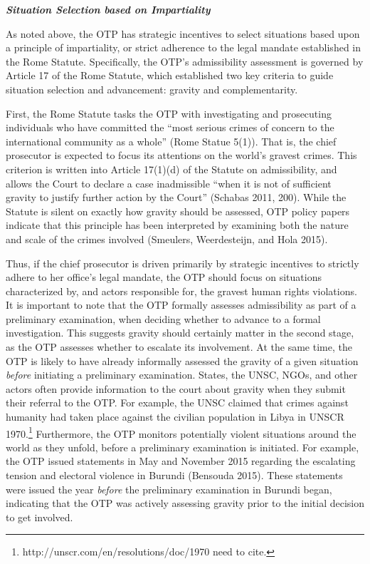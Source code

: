 \emph{\textbf{Situation Selection based on Impartiality}}

As noted above, the OTP has strategic incentives to select situations based upon a principle of impartiality, or strict adherence to the legal mandate established in the Rome Statute. Specifically, the OTP's admissibility assessment is governed by Article 17 of the Rome Statute, which established two key criteria to guide situation selection and advancement: gravity and complementarity.

First, the Rome Statute tasks the OTP with investigating and prosecuting individuals who have committed the ``most serious crimes of concern to the international community as a whole'' (Rome Statue 5(1)). That is, the chief prosecutor is expected to focus its attentions on the world's gravest crimes. This criterion is written into Article 17(1)(d) of the Statute on admissibility, and allows the Court to declare a case inadmissible ``when it is not of sufficient gravity to justify further action by the Court'' (Schabas 2011, 200). While the Statute is silent on exactly how gravity should be assessed, OTP policy papers indicate that this principle has been interpreted by examining both the nature and scale of the crimes involved (Smeulers, Weerdesteijn, and Hola 2015).

Thus, if the chief prosecutor is driven primarily by strategic incentives to strictly adhere to her office's legal mandate, the OTP should focus on situations characterized by, and actors responsible for, the gravest human rights violations. It is important to note that the OTP formally assesses admissibility as part of a preliminary examination, when deciding whether to advance to a formal investigation. This suggests gravity should certainly matter in the second stage, as the OTP assesses whether to escalate its involvement. At the same time, the OTP is likely to have already informally assessed the gravity of a given situation \emph{before} initiating a preliminary examination. States, the UNSC, NGOs, and other actors often provide information to the court about gravity when they submit their referral to the OTP. For example, the UNSC claimed that crimes against humanity had taken place against the civilian population in Libya in UNSCR 1970.\footnote{http://unscr.com/en/resolutions/doc/1970 need to cite.} Furthermore, the OTP monitors potentially violent situations around the world as they unfold, before a preliminary examination is initiated. For example, the OTP issued statements in May and November 2015 regarding the escalating tension and electoral violence in Burundi (Bensouda 2015). These statements were issued the year \emph{before} the preliminary examination in Burundi began, indicating that the OTP was actively assessing gravity prior to the initial decision to get involved.

